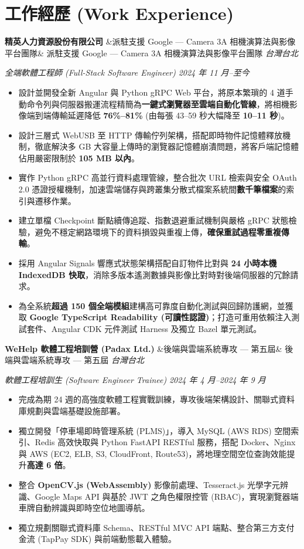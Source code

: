 \documentclass[10pt,a4paper]{article}
\newcommand{\entryheader}[3]{%
  \noindent%
  \textbf{\color{maindark}#1}%
  \ifx&#2&%
  \else%
    { \small\color{subgray}#2}%
  \fi%
  \hfill%
  \textit{\color{locationcoral}#3}\par%
}
\newcommand{\entrysubheader}[2]{%
  \noindent%
  \textit{\color{subgray}#1}%
  \hfill%
  \textit{\color{subgray}#2}\par%
  \vspace{1.5pt}%
}
\begin{document}
\section{工作經歷 (Work Experience)}

\entryheader{精英人力資源股份有限公司}{派駐支援 Google --- Camera 3A 相機演算法與影像平台團隊}{台灣台北}
\entrysubheader{全端軟體工程師 (Full-Stack Software Engineer)}{2024 年 11 月--至今}
\begin{itemize}
    \item {設計並開發全新 Angular 與 Python gRPC Web 平台，將原本繁瑣的 4 道手動命令列與伺服器搬運流程精簡為\textbf{一鍵式瀏覽器至雲端自動化管線}，將相機影像端到端傳輸延遲降低 \textbf{76\%--81\%} (由每張 43--59 秒大幅降至 \textbf{10--11 秒})。}
    \item {設計三層式 WebUSB 至 HTTP 傳輸佇列架構，搭配即時物件記憶體釋放機制，徹底解決多 GB 大容量上傳時的瀏覽器記憶體崩潰問題，將客戶端記憶體佔用嚴密限制於 \textbf{105 MB 以內}。}
    \item {實作 Python gRPC 高並行資料處理管線，整合批次 URL 檢索與安全 OAuth 2.0 憑證授權機制，加速雲端儲存與跨叢集分散式檔案系統間\textbf{數千筆檔案}的索引與遷移作業。}
    \item {建立單檔 Checkpoint 斷點續傳追蹤、指數退避重試機制與嚴格 gRPC 狀態檢驗，避免不穩定網路環境下的資料損毀與重複上傳，\textbf{確保重試過程零重複傳輸}。}
    \item {採用 Angular Signals 響應式狀態架構搭配自訂物件比對與 \textbf{24 小時本機 IndexedDB 快取}，消除多版本遙測數據與影像比對時對後端伺服器的冗餘請求。}
    \item {為全系統\textbf{超過 150 個全端模組}建構高可靠度自動化測試與回歸防護網，並獲取 \textbf{Google TypeScript Readability (可讀性認證)}；打造可重用依賴注入測試套件、Angular CDK 元件測試 Harness 及獨立 Bazel 單元測試。}
\end{itemize}

\vspace{3pt}

\entryheader{WeHelp 軟體工程培訓營 (Padax Ltd.)}{後端與雲端系統專攻 --- 第五屆}{台灣台北}
\entrysubheader{軟體工程培訓生 (Software Engineer Trainee)}{2024 年 4 月--2024 年 9 月}
\begin{itemize}
    \item {完成為期 24 週的高強度軟體工程實戰訓練，專攻後端架構設計、關聯式資料庫規劃與雲端基礎設施部署。}
    \item {獨立開發「停車場即時管理系統 (PLMS)」，導入 MySQL (AWS RDS) 空間索引、Redis 高效快取與 Python FastAPI RESTful 服務，搭配 Docker、Nginx 與 AWS (EC2, ELB, S3, CloudFront, Route53)，將地理空間空位查詢效能提升\textbf{高達 6 倍}。}
    \item {整合 \textbf{OpenCV.js (WebAssembly)} 影像前處理、Tesseract.js 光學字元辨識、Google Maps API 與基於 JWT 之角色權限控管 (RBAC)，實現瀏覽器端車牌自動辨識與即時空位地圖導航。}
    \item {獨立規劃關聯式資料庫 Schema、RESTful MVC API 端點、整合第三方支付金流 (TapPay SDK) 與前端動態載入體驗。}
\end{itemize}
\end{document}
